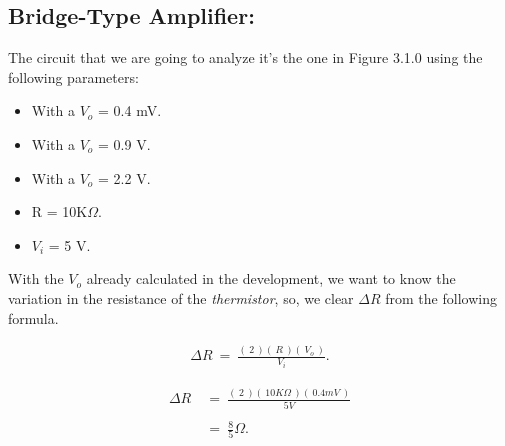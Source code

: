 \subsection{Bridge-Type Amplifier:}

\setcounter{equation}{0}

The circuit that we are going to analyze it's the one in Figure 3.1.0 using the following parameters: \hfill \break

{\bfseries
\begin{itemize}
\item With a $V_{o}$ = 0.4 mV.
\item With a $V_{o}$ = 0.9 V.
\item With a $V_{o}$ = 2.2 V.
\item R = 10K$\Omega$.
\item $V_{i}$ = 5 V.
\end{itemize}} \hfill

{\bfseries\itshape\color{Violet}{
\begin{itemize}
\item For $\Delta R$:
\end{itemize}}} \hfill

With the $V_{o}$ already calculated in the development, we want to know the variation in the resistance of the {\itshape thermistor}, so, we clear $\Delta R$ from the following formula. \hfill \break \break

\begin{flushright}
{\bfseries\itshape{}} \hfill \break
\end{flushright}

\begin{ceqn}
\begin{align}
\Delta R\ =\ \frac{(\ 2\ )(\ R\ )(\ V_{o}\ )}{V_{i}}.
\end{align}
\end{ceqn} \hfill \break

{\bfseries\itshape{}} \hfill

\begin{ceqn}
\begin{align*}
\Delta R\ &=\ \frac{(\ 2\ )(\ 10K\Omega\ )(\ 0.4mV\ )}{5V} \\ \\
&=\ \frac{8}{5}\Omega.
\end{align*}
\end{ceqn} \hfill \break

